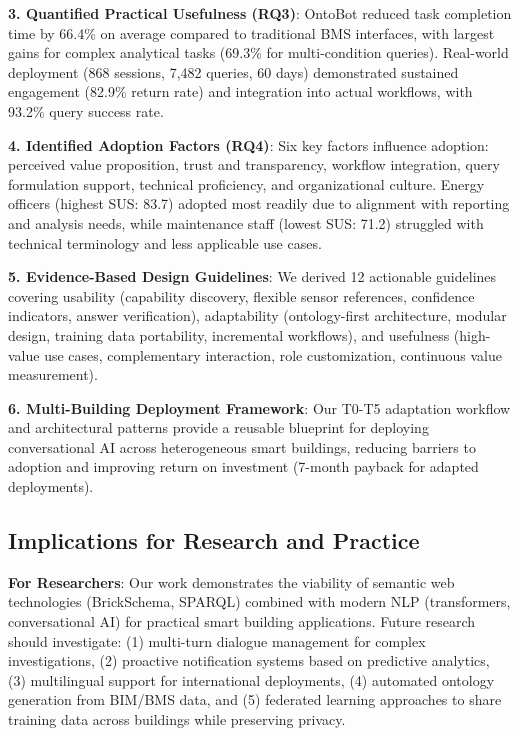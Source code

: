 \documentclass[acmlarge]{acmart}
\begin{document}
\textbf{3. Quantified Practical Usefulness (RQ3)}: OntoBot reduced task completion time by 66.4\% on average compared to traditional BMS interfaces, with largest gains for complex analytical tasks (69.3\% for multi-condition queries). Real-world deployment (868 sessions, 7,482 queries, 60 days) demonstrated sustained engagement (82.9\% return rate) and integration into actual workflows, with 93.2\% query success rate.

\textbf{4. Identified Adoption Factors (RQ4)}: Six key factors influence adoption: perceived value proposition, trust and transparency, workflow integration, query formulation support, technical proficiency, and organizational culture. Energy officers (highest SUS: 83.7) adopted most readily due to alignment with reporting and analysis needs, while maintenance staff (lowest SUS: 71.2) struggled with technical terminology and less applicable use cases.

\textbf{5. Evidence-Based Design Guidelines}: We derived 12 actionable guidelines covering usability (capability discovery, flexible sensor references, confidence indicators, answer verification), adaptability (ontology-first architecture, modular design, training data portability, incremental workflows), and usefulness (high-value use cases, complementary interaction, role customization, continuous value measurement).

\textbf{6. Multi-Building Deployment Framework}: Our T0-T5 adaptation workflow and architectural patterns provide a reusable blueprint for deploying conversational AI across heterogeneous smart buildings, reducing barriers to adoption and improving return on investment (7-month payback for adapted deployments).

\subsection{Implications for Research and Practice}

\textbf{For Researchers}: Our work demonstrates the viability of semantic web technologies (BrickSchema, SPARQL) combined with modern NLP (transformers, conversational AI) for practical smart building applications. Future research should investigate: (1) multi-turn dialogue management for complex investigations, (2) proactive notification systems based on predictive analytics, (3) multilingual support for international deployments, (4) automated ontology generation from BIM/BMS data, and (5) federated learning approaches to share training data across buildings while preserving privacy.
\end{document}
